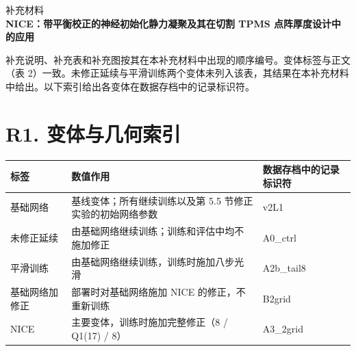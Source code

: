 \documentclass[preprint,12pt,authoryear]{elsarticle}
\begin{document}
\begin{center}{\Large 补充材料}\\[4pt]{\Large\bfseries NICE：带平衡校正的神经初始化静力凝聚及其在切割 TPMS 点阵厚度设计中的应用}\end{center}

补充说明、补充表和补充图按其在本补充材料中出现的顺序编号。变体标签与正文（表 2）一致。未修正延续与平滑训练两个变体未列入该表，其结果在本补充材料中给出。以下索引给出各变体在数据存档中的记录标识符。

\section{R1. 变体与几何索引}

{\small
\begin{longtable}[]{@{}
  >{\raggedright\arraybackslash}p{}
  >{\raggedright\arraybackslash}p{}
  >{\raggedright\arraybackslash}p{}@{}}
\toprule\noalign{}
\begin{minipage}[b]{\linewidth}\raggedright
标签
\end{minipage} & \begin{minipage}[b]{\linewidth}\raggedright
数值作用
\end{minipage} & \begin{minipage}[b]{\linewidth}\raggedright
数据存档中的记录标识符
\end{minipage} \\
\midrule\noalign{}
\endhead
\bottomrule\noalign{}
\endlastfoot
基础网络 & 基线变体；所有继续训练以及第 5.5 节修正实验的初始网络参数 & v2L1 \\
未修正延续 & 由基础网络继续训练；训练和评估中均不施加修正 & A0\_ctrl \\
平滑训练 & 由基础网络继续训练，训练时施加八步光滑 & A2b\_tail8 \\
基础网络加修正 & 部署时对基础网络施加 NICE 的修正，不重新训练 & B2grid \\
NICE & 主要变体，训练时施加完整修正（8 / Q1(17) / 8） & A3\_2grid \\
\end{longtable}}
\end{document}
